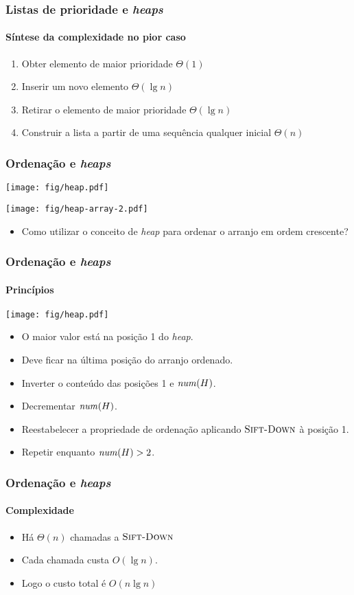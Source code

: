 \documentclass{beamer}
\begin{document}
\begin{frame}

\frametitle{Listas de prioridade e \textit{heaps\/}}
\framesubtitle{Síntese da complexidade no pior caso}

\begin{enumerate}
\item Obter elemento de maior prioridade $\Theta(1)$
\item Inserir um novo elemento $\Theta(\lg n)$
\item Retirar o elemento de maior prioridade  $\Theta(\lg n)$
\item Construir a lista a partir de uma sequência qualquer inicial $\Theta(n)$
\end{enumerate}

\end{frame}

\begin{frame}

\frametitle{Ordenação e \textit{heaps\/}}

{\center \texttt{[image: fig/heap.pdf]}}

{\center \texttt{[image: fig/heap-array-2.pdf]}}

\begin{itemize}
\item Como utilizar o conceito de \textit{heap\/} para ordenar o arranjo em
  ordem crescente?
\end{itemize}

\end{frame}

\begin{frame}

\frametitle{Ordenação e \textit{heaps\/}}
\framesubtitle{Princípios}

{\center \texttt{[image: fig/heap.pdf]}}

\begin{itemize}
\item O maior valor está na posição 1 do \textit{heap\/}.
\item Deve ficar na última posição do arranjo ordenado.
\pause
\item Inverter o conteúdo das posições 1 e $\id{num}(H)$.
\item Decrementar $\id{num}(H)$.
\item Reestabelecer a propriedade de ordenação aplicando $\textnormal{\scshape Sift-Down}$
  à posição 1.
\item Repetir enquanto $\id{num}(H) > 2$.
\end{itemize}

\end{frame}

\begin{frame}

\frametitle{Ordenação e \textit{heaps\/}}
\framesubtitle{Complexidade}

\begin{itemize}
\item Há $\Theta(n)$ chamadas a $\textnormal{\scshape Sift-Down}$
\item Cada chamada custa $O(\lg n)$.
\item Logo o custo total é $O(n \lg n)$
\end{itemize}

\end{frame}
\end{document}
